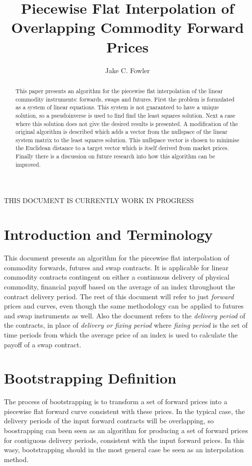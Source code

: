 \documentclass{article}
\title{Piecewise Flat Interpolation of Overlapping Commodity Forward Prices}
\author{Jake C. Fowler}
\date{}
\begin{document}
\newcommand{\+}[1]{\ensuremath{\mathbf{#1}}}

\maketitle

THIS DOCUMENT IS CURRENTLY WORK IN PROGRESS


\begin{abstract}
    This paper presents an algorithm for the piecewise flat interpolation of the linear commodity
    instruments: forwards, swaps and futures. First the 
    problem is formulated as a system of linear equations. This system is not guaranteed to have
    a unique solution, so a pseudoinverse is used to find
    find the least squares solution. Next a case where this solution does not give
    the desired results is presented. A modification of the original algorithm is
    described which adds a vector from the nullspace of the linear system matrix to
    the least squares solution. This nullspace vector is chosen to minimise the 
    Euclidean distance to a target vector which is itself derived from market prices.
    Finally there is a discussion on future research into how this algorithm can be 
    improved.
\end{abstract}


\section{Introduction and Terminology}
This document presents an algorithm for the piecewise flat interpolation of commodity forwards, futures and swap 
contracts. It is applicable for linear commodity contracts contingent on either a continuous delivery
of physical commodity, financial payoff based on the average of an index throughout the
contract delivery period. The rest of this document will refer to just \emph{forward} prices and curves, even though the same 
methodology can be applied to futures and swap instruments as well. Also the document refers 
to the \emph{delivery period} of the contracts, in place of 
\emph{delivery or fixing period} where \emph{fixing period} is the set of time periods from 
which the average price of an index is used to calculate the payoff of a swap contract.

\section{Bootstrapping Definition}
The process of bootstrapping is to transform a set of forward prices into a piecewise 
flat forward curve consistent with these prices. In the typical case, the delivery periods 
of the input forward contracts will be overlapping, so boostrapping can been seen as an
algorithm for producing a set of forward prices for contiguous delivery periods, consistent
with the input forward prices.
In this wasy, bootstrapping should in the most general case be seen as an interpolation method.
\end{document}
